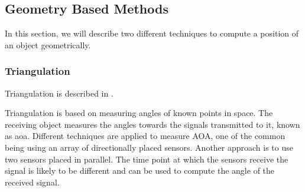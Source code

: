 
\subsection{Geometry Based Methods}
In this section, we will describe two different techniques to compute a position of an object geometrically.

\subsubsection{Triangulation} \label{sec:triangulation}
Triangulation is described in \cite{Triangulation}.

Triangulation is based on measuring angles of known points in space. The receiving object measures the angles towards the signals transmitted to it, known as \gls{aoa}. Different techniques are applied to measure AOA, one of the common being using an array of directionally placed sensors. Another approach is to use two sensors placed in parallel. The time point at which the sensors receive the signal is likely to be different and can be used to compute the angle of the received signal.

